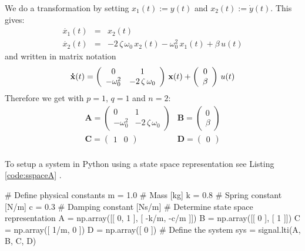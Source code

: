 \documentclass[a4paper,12pt]{article}
\newcommand*{\CodeLabel}{}
\newcommand*{\CodeCaption}{}
\newenvironment{code}[3]%
	{\renewcommand*{\CodeLabel}{#2}\renewcommand*{\CodeCaption}{#3}\codefloat\hrulefill\minted{#1}}
	{\endminted\caption{\CodeCaption\label{code:\CodeLabel}}\hrulefill\endcodefloat}
\newcommand{\CodeRef}[1]{%
	Listing \ref{code:#1}%
	}
\renewcommand{\Vec}[1]{{\bf #1}}
\newcommand{\Mat}[1]{\mathbf{#1}}
\begin{document}
We do a transformation by setting $x_1(t):=y(t)$ and $x_2(t):=\dot{y}(t)$. This
gives:
\begin{eqnarray}
	\dot{x_1}(t)&=&x_2(t)\\
	\dot{x_2}(t)&=&-2\,\zeta\,\omega_0\,x_2(t)-\omega_0^2\,x_1(t)+\beta\,u(t)
\end{eqnarray}
and written in matrix notation
\begin{equation}
\Vec{\dot{x}}(t)=\left(\begin{array}{cc}0 & 1\\-\omega_0^2 & -2\,\zeta\,\omega_0\end{array}\right)\,\Vec{x}(t)+\left(\begin{array}{c}0\\\beta\end{array}\right)\,u(t)
\end{equation}
Therefore we get with $p=1$, $q=1$ and $n=2$:
\begin{equation}
\begin{array}{ll}
	\Mat{A}=\left(\begin{array}{cc}
		0 & 1\\
		-\omega_0^2 & -2\,\zeta\,\omega_0
	\end{array}\right) &
	\Mat{B}=\left(\begin{array}{c}
		0\\
		\beta
	\end{array}\right)\\[4ex]
	\Mat{C}=\left(\begin{array}{cc}
		1 & 0
	\end{array}\right) &
	\Mat{D}=\left(\begin{array}{c}
		0
	\end{array}\right)\\
\end{array}
\end{equation}

To setup a system in Python using a state space representation see \CodeRef{sspaceA}.

\begin{code}{python}{sspaceA}{Initialize system using state-space representation}
# Define physical constants
m = 1.0 # Mass [kg]
k = 0.8 # Spring constant [N/m]
c = 0.3 # Damping constant [Ns/m]
# Determine state space representation
A = np.array([[ 0, 1 ], [ -k/m, -c/m ]])
B = np.array([[ 0 ], [ 1 ]])
C = np.array([ 1/m, 0 ])
D = np.array([ 0 ])
# Define the system
sys = signal.lti(A, B, C, D)
\end{code}
\end{document}

